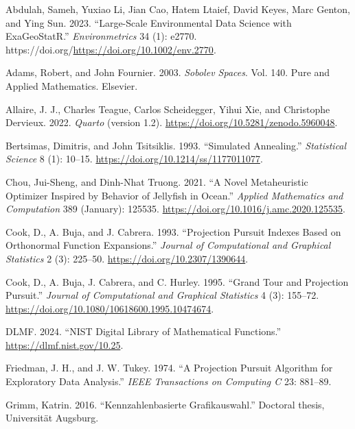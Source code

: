 \documentclass[
  12pt,
]{interact}
\newlength{\cslhangindent}
\newenvironment{CSLReferences}[2] %
 {\begin{list}{}{%
  \setlength{\itemindent}{0pt}
  \setlength{\leftmargin}{0pt}
  \setlength{\parsep}{0pt}
  \ifodd #1
   \setlength{\leftmargin}{\cslhangindent}
   \setlength{\itemindent}{-1\cslhangindent}
  \fi
  \setlength{\itemsep}{#2\baselineskip}}}
 {\end{list}}
\theoremstyle{plain}
\begin{document}
\label{refs}
\begin{CSLReferences}{1}{0}
Abdulah, Sameh, Yuxiao Li, Jian Cao, Hatem Ltaief, David Keyes, Marc
Genton, and Ying Sun. 2023. {``Large-Scale Environmental Data Science
with {ExaGeoStatR}.''} \emph{Environmetrics} 34 (1): e2770.
https://doi.org/\url{https://doi.org/10.1002/env.2770}.

Adams, Robert, and John Fournier. 2003. \emph{Sobolev Spaces}. Vol. 140.
Pure and Applied Mathematics. Elsevier.

Allaire, J. J., Charles Teague, Carlos Scheidegger, Yihui Xie, and
Christophe Dervieux. 2022. \emph{{Quarto}} (version 1.2).
\url{https://doi.org/10.5281/zenodo.5960048}.

Bertsimas, Dimitris, and John Tsitsiklis. 1993. {``{Simulated
Annealing}.''} \emph{Statistical Science} 8 (1): 10--15.
\url{https://doi.org/10.1214/ss/1177011077}.

Chou, Jui-Sheng, and Dinh-Nhat Truong. 2021. {``A Novel Metaheuristic
Optimizer Inspired by Behavior of Jellyfish in Ocean.''} \emph{Applied
Mathematics and Computation} 389 (January): 125535.
\url{https://doi.org/10.1016/j.amc.2020.125535}.

Cook, D., A. Buja, and J. Cabrera. 1993. {``Projection Pursuit Indexes
Based on Orthonormal Function Expansions.''} \emph{Journal of
Computational and Graphical Statistics} 2 (3): 225--50.
\url{https://doi.org/10.2307/1390644}.

Cook, D., A. Buja, J. Cabrera, and C. Hurley. 1995. {``Grand Tour and
Projection Pursuit.''} \emph{Journal of Computational and Graphical
Statistics} 4 (3): 155--72.
\url{https://doi.org/10.1080/10618600.1995.10474674}.

DLMF. 2024. {``{NIST Digital Library of Mathematical Functions}.''}
\url{https://dlmf.nist.gov/10.25}.

Friedman, J. H., and J. W. Tukey. 1974. {``{A} {P}rojection {P}ursuit
{A}lgorithm for {E}xploratory {D}ata {A}nalysis.''} \emph{IEEE
Transactions on Computing C} 23: 881--89.

Grimm, Katrin. 2016. {``Kennzahlenbasierte Grafikauswahl.''} Doctoral
thesis, Universit{ä}t Augsburg.


\end{CSLReferences}
\end{document}
